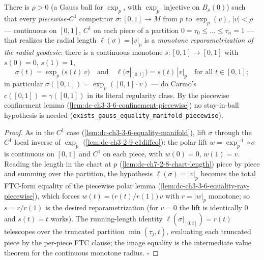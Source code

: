 \begin{lemma}
  \label{lem:dc-ch3-3-6-equality-manifold-piecewise}
  \leanok
  There is $\rho>0$ (a Gauss ball for $\exp_p$, with $\exp_p$ injective on
  $B_\rho(0)$) such that every \emph{piecewise-$C^1$} competitor
  $\sigma:[0,1]\to M$ from $p$ to $\exp_p(v)$, $|v|<\rho$ — continuous on
  $[0,1]$, $C^1$ on each piece of a partition $0=\tau_0\le\dots\le\tau_n=1$ —
  that realizes the radial length $\ell(\sigma)=|v|_p$ is a \emph{monotone
  reparametrization of the radial geodesic}: there is a continuous monotone
  $s:[0,1]\to[0,1]$ with $s(0)=0$, $s(1)=1$,
  $$\sigma(t)=\exp_p\big(s(t)\,v\big)\quad\text{and}\quad
    \ell\big(\sigma|_{[0,t]}\big)=s(t)\,|v|_p\quad\text{for all }t\in[0,1];$$
  in particular $\sigma([0,1])=\exp_p([0,1]\cdot v)$ — do Carmo's
  $c([0,1])=\gamma([0,1])$ in its literal regularity class. By the piecewise
  confinement lemma (\cref{lem:dc-ch3-3-6-confinement-piecewise}) no
  stay-in-ball hypothesis is needed
  (\texttt{exists\_gauss\_equality\_manifold\_piecewise}).
\end{lemma}
\begin{proof}
  \leanok
  As in the $C^1$ case (\cref{lem:dc-ch3-3-6-equality-manifold}), lift
  $\sigma$ through the $C^1$ local inverse of $\exp_p$
  (\cref{lem:dc-ch3-2-9-c1diffeo}): the polar lift $w=\exp_p^{-1}\circ\sigma$
  is continuous on $[0,1]$ and $C^1$ on each piece, with $w(0)=0$,
  $w(1)=v$. Reading the length in the chart at $p$
  (\cref{lem:dc-ch7-2-8-chart-length}) piece by piece and summing over the
  partition, the hypothesis $\ell(\sigma)=|v|_p$ becomes the total FTC-form
  equality of the piecewise polar lemma
  (\cref{lem:dc-ch3-3-6-equality-ray-piecewise}), which forces
  $w(t)=\bigl(r(t)/r(1)\bigr)\,v$ with $r=|w|_p$ monotone; so $s=r/r(1)$ is
  the desired reparametrization (for $v=0$ the lift is identically $0$ and
  $s(t)=t$ works). The running-length identity
  $\ell(\sigma|_{[0,t]})=r(t)$ telescopes over the truncated partition
  $\min(\tau_j,t)$, evaluating each truncated piece by the per-piece FTC
  clause; the image equality is the intermediate value theorem for the
  continuous monotone radius. $\square$
\end{proof}

